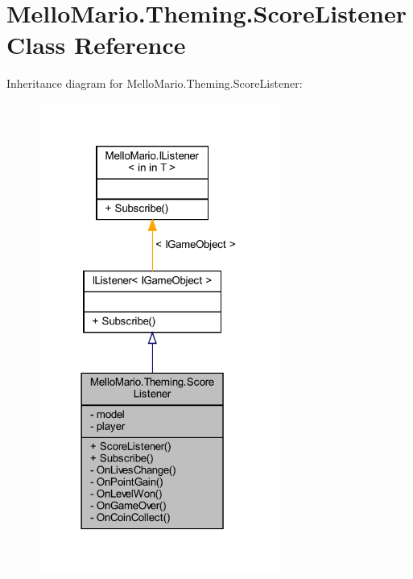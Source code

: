 \section{Mello\+Mario.\+Theming.\+Score\+Listener Class Reference}
\label{classMelloMario_1_1Theming_1_1ScoreListener}


Inheritance diagram for Mello\+Mario.\+Theming.\+Score\+Listener\+:
\nopagebreak
\begin{figure}[H]
\begin{center}
\leavevmode
\includegraphics[width=225pt]{classMelloMario_1_1Theming_1_1ScoreListener__inherit__graph}
\end{center}
\end{figure}


